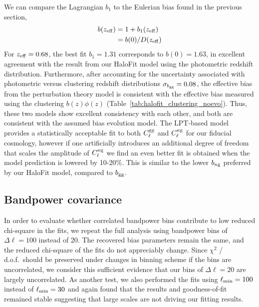 \documentclass[a4paper,usenatbib]{mnras}
\begin{document}
We can compare the Lagrangian $b_1$ to the Eulerian bias found in the previous section,
\begin{align}
    b(z_{\rm eff}) &= 1 + b_1(z_{\rm eff}) \\
    &= b(0)/D(z_{\rm eff})
\end{align}
For $z_{\rm eff} = 0.68$, the best fit $b_1 = 1.31$ corresponds to $b(0) = 1.63$, in excellent agreement with the result from our HaloFit model using the photometric redshift distribution. Furthermore, after accounting for the uncertainty associated with photometric versus clustering redshift distributions $\sigma_{b_{\rm gg}} = 0.08$, the effective bias from the perturbation theory model is consistent with the effective bias measured using the clustering $b(z)\phi(z)$ (Table~\ref{tab:halofit_clustering_noevo}). Thus, these two models show excellent consistency with each other, and both are consistent with the assumed bias evolution model.  The LPT-based model provides a statistically acceptable fit to both $C_\ell^{\rm gg}$ and $C_\ell^{\rm \kappa g}$ for our fiducial cosmology, however if one artificially introduces an additional degree of freedom that scales the amplitude of $C_\ell^{\rm \kappa g}$ we find an even better fit is obtained when the model prediction is lowered by 10-20\%.  This is similar to the lower $b_{\rm \kappa g}$ preferred by our HaloFit model, compared to $b_{\rm gg}$.


\subsection{Bandpower covariance}\label{sec:results/discussion}

In order to evaluate whether correlated bandpower bins contribute to low reduced chi-square in the fits, we repeat the full analysis using bandpower bins of $\Delta \ell = 100$ instead of 20. The recovered bias parameters remain the same, and the reduced chi-square of the fits do not appreciably change. Since $\chi^2$ / d.o.f.\ should be preserved under changes in binning scheme if the bins are uncorrelated, we consider this sufficient evidence that our bins of $\Delta \ell = 20$ are largely uncorrelated. As another test, we also performed the fits using $\ell_{\rm min} = 100$ instead of $\ell_{\rm min} = 30$ and again found that the results and goodness-of-fit remained stable suggesting that large scales are not driving our fitting results.

%
\end{document}
